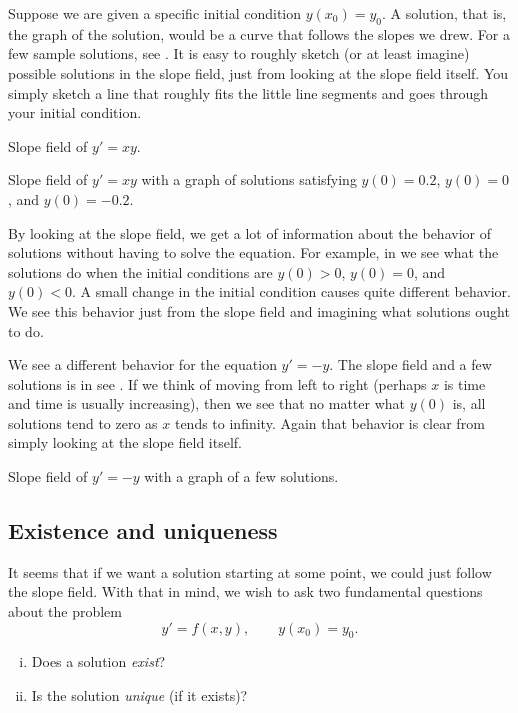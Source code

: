 Suppose we are given a specific initial condition $y(x_0) = y_0$.
A solution, that is, the graph of the solution, would be a curve
that follows the slopes we drew.
For a few sample
solutions, see .  It is easy to roughly sketch
(or at least imagine)
possible solutions in the slope field, just from looking at the slope field
itself.  You simply sketch a line that roughly fits the little line segments
and goes through your initial condition.

\begin{myfig}
\parbox[t]{3.0in}{
 \capstart
 \caption{Slope field of $y' = xy$.\label{1.3:fig1}}
}
\quad
\parbox[t]{3.0in}{
 \capstart
 \caption{Slope field of $y' = xy$ with a graph of solutions satisfying
 $y(0) = 0.2$, $y(0) = 0$, and $y(0) = -0.2$.\label{1.3:fig2}}
}
\end{myfig}

By looking at the slope field, we get a lot of information
about the behavior of solutions without having to solve
the equation.  For
example, in  we see what the solutions do when the initial conditions
are $y(0) > 0$, $y(0) = 0$, and $y(0) < 0$.
A small change in the
initial condition causes quite different behavior.
We see this behavior just
from the slope field and imagining what solutions ought to do.

We see a different behavior for the equation
$y' = -y$.  The slope field and a few solutions is in
see .
If we think of moving from left to right (perhaps $x$ is time
and time is usually increasing), then
we see that no matter what $y(0)$ is, all solutions tend to zero as $x$
tends to infinity.
Again that behavior is clear from simply
looking at the slope field itself.

\begin{myfig}
\capstart
{}
\caption{Slope field of $y' = -y$ with a graph of a few solutions.\label{1.3:fig3}}
\end{myfig}

\subsection{Existence and uniqueness}

It seems that if we want a solution starting at some point,
we could just follow the slope field.
With that in mind,
we wish to ask two fundamental questions about the problem
\begin{equation*}
y' = f(x,y), \qquad y(x_0) = y_0.
\end{equation*}
\begin{enumerate}[(i)]
\item Does a solution \emph{exist}?
\item Is the solution \emph{unique} (if it exists)?
\end{enumerate}

